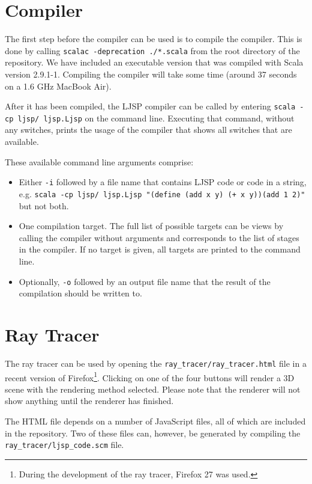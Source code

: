 \documentclass[11pt]{report}
\begin{document}
\section{Compiler}
The first step before the compiler can be used is to compile the compiler. This is done by calling \texttt{scalac -deprecation ./*.scala} from the root directory of the repository. We have included an executable version that was compiled with Scala version 2.9.1-1. Compiling the compiler will take some time (around 37 seconds on a 1.6 GHz MacBook Air).

After it has been compiled, the LJSP compiler can be called by entering \texttt{scala -cp ljsp/ ljsp.Ljsp} on the command line. Executing that command, without any switches, prints the usage of the compiler that shows all switches that are available.

These available command line arguments comprise:
\begin{itemize}
\item Either \texttt{-i} followed by a file name that contains LJSP code or code in a string, e.g. \texttt{scala -cp ljsp/ ljsp.Ljsp "(define (add x y) (+ x y))(add 1 2)"} but not both.
\item One compilation target. The full list of possible targets can be views by calling the compiler without arguments and corresponds to the list of stages in the compiler. If no target is given, all targets are printed to the command line.
\item Optionally, \texttt{-o} followed by an output file name that the result of the compilation should be written to.
\end{itemize}

\section{Ray Tracer}

The ray tracer can be used by opening the \texttt{ray_tracer/ray_tracer.html} file in a recent version of Firefox\footnote{During the development of the ray tracer, Firefox 27 was used.}. Clicking on one of the four buttons will render a 3D scene with the rendering method selected. Please note that the renderer will not show anything until the renderer has finished. 

The HTML file depends on a number of JavaScript files, all of which are included in the repository. Two of these files can, however, be generated by compiling the \texttt{ray_tracer/ljsp_code.scm} file.
\end{document}

